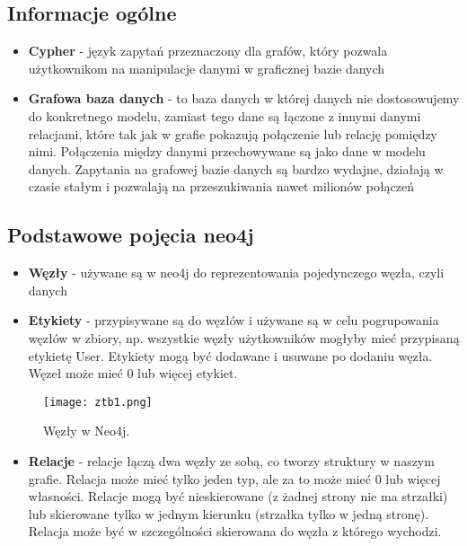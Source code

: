 \documentclass[a4paper,15pt]{article}
\begin{document}
\subsection{Informacje ogólne}
\begin{itemize}
\item \textbf{Cypher} - język zapytań przeznaczony dla grafów, który pozwala użytkownikom na manipulacje danymi w graficznej bazie danych
\item \textbf{Grafowa baza danych} - to baza danych w której danych nie dostosowujemy do konkretnego modelu, zamiast tego dane są łączone z innymi danymi relacjami, które tak jak w grafie pokazują połączenie lub relację pomiędzy nimi. Połączenia między danymi przechowywane są jako dane w modelu danych. Zapytania na grafowej bazie danych są bardzo wydajne, działają w czasie stałym i pozwalają na przeszukiwania nawet milionów połączeń
\end{itemize}

\subsection{Podstawowe pojęcia neo4j}

\begin{itemize}
\item \textbf{Węzły} - używane są w neo4j do reprezentowania pojedynczego węzła, czyli danych
\item \textbf{Etykiety} - przypisywane są do węzłów i używane są w celu pogrupowania węzłów w zbiory, np. wszystkie węzły użytkowników mogłyby mieć przypisaną etykietę User. Etykiety mogą być dodawane i usuwane po dodaniu węzła. Węzeł może mieć 0 lub więcej etykiet. 
\end{itemize}

\begin{figure}[H]
  \texttt{[image: ztb1.png]}
  \caption{Węzły w Neo4j.}
  \label{fig:nodes}
  
\end{figure}
\begin{itemize}
\item \textbf{Relacje} - relacje łączą dwa węzły ze sobą, co tworzy struktury w naszym grafie. Relacja może mieć tylko jeden typ, ale za to może mieć 0 lub więcej własności. Relacje mogą być nieskierowane (z żadnej strony nie ma strzałki) lub skierowane tylko w jednym kierunku (strzałka tylko w jedną stronę). Relacja może być w szczególności skierowana do węzła z którego wychodzi. 
\end{itemize}
\end{document}
